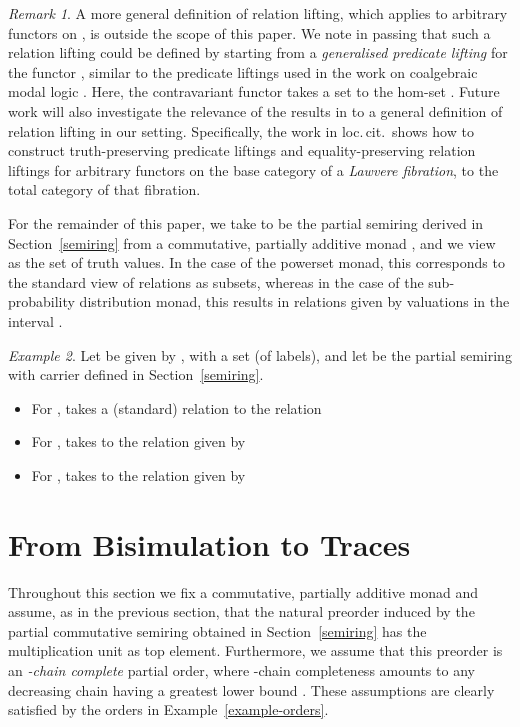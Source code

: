 \documentclass[submission,copyright,creativecommons]{eptcs}
\theoremstyle{plain}\newtheorem{theorem}{Theorem}[section]
\theoremstyle{remark}
\newtheorem{remark}{Remark}[section]
\newtheorem{example}[remark]{Example}
\begin{document}
\begin{remark}
A more general definition of relation lifting, which applies to arbitrary functors on , is outside the scope of this paper. We note in passing that such a relation lifting could be defined by starting from a \emph{generalised predicate lifting}  for the functor , similar to the predicate liftings used in the work on coalgebraic modal logic \cite{Pattinson03}. Here, the contravariant functor  takes a set  to the hom-set . Future work will also investigate the relevance of the results in \cite{Ghani2011,Ghani2012} to a general definition of relation lifting in our setting. Specifically, the work in loc.\,cit.~shows how to construct truth-preserving predicate liftings and equality-preserving relation liftings for arbitrary functors on the base category of a \emph{Lawvere fibration}, to the total category of that fibration.
\end{remark}
For the remainder of this paper, we take  to be the partial semiring derived in Section~\ref{semiring} from a commutative, partially additive monad , and we view  as the set of truth values.
In the case of the powerset monad, this corresponds to the standard view of relations as subsets, whereas in the case of the sub-probability distribution monad, this results in relations given by valuations in the interval .

\begin{example}
Let  be given by , with  a set (of labels), and let  be the partial semiring with carrier  defined in Section~\ref{semiring}.
\begin{itemize}
\item For ,  takes a (standard) relation  to the relation

\item For ,  takes  to the relation  given by

\item For ,  takes  to the relation  given by

\end{itemize}
\end{example}

\section{From Bisimulation to Traces}
\label{linear-time}

Throughout this section we fix a commutative, partially additive monad  and assume, as in the previous section, that the natural preorder  induced by the partial commutative semiring obtained in Section~\ref{semiring} has the multiplication unit  as top element. Furthermore, we assume that this preorder is an \emph{-chain complete} partial order, where -chain completeness amounts to  any decreasing chain  having a greatest lower bound . These assumptions are clearly satisfied by the orders in Example~\ref{example-orders}. 
\end{document}
